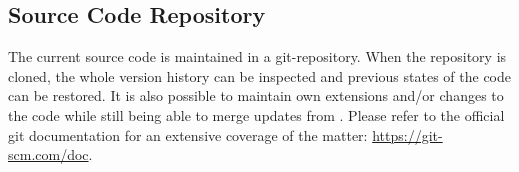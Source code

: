 \documentclass{sd_report}
\begin{document}
%
%
%

\subsection{Source Code Repository}
The current source code is maintained in a git-repository.
When the repository is cloned, the whole version history can be inspected and previous states of the code can be restored.
It is also possible to maintain own extensions and/or changes to the code while still being able to merge updates from \sd.
Please refer to the official git documentation for an extensive coverage of the matter: \url{https://git-scm.com/doc}.
\end{document}
